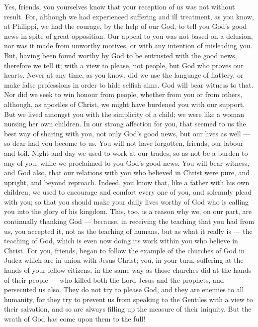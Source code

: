 Yes, friends, you yourselves know that your reception of us
was not without result.  For, although we had experienced
suffering and ill treatment, as you know, at Philippi, we had the
courage, by the help of our God, to tell you God's good news in spite of
great opposition.  Our appeal to you was not based on a
delusion, nor was it made from unworthy motives, or with any intention
of misleading you.  But, having been found worthy by God to
be entrusted with the good news, therefore we tell it; with a view to
please, not people, but God who proves our hearts.  Never at
any time, as you know, did we use the language of flattery, or make
false professions in order to hide selfish aims. God will bear witness
to that.  Nor did we seek to win honour from people, whether
from you or from others, although, as apostles of Christ, we might have
burdened you with our support.  But we lived amongst you
with the simplicity of a child; we were like a woman nursing her own
children.  In our strong affection for you, that seemed to
us the best way of sharing with you, not only God's good news, but our
lives as well --- so dear had you become to us.  You will
not have forgotten, friends, our labour and toil. Night and day we used
to work at our trades, so as not be a burden to any of you, while we
proclaimed to you God's good news.  You will bear witness,
and God also, that our relations with you who believed in Christ were
pure, and upright, and beyond reproach.  Indeed, you know
that, like a father with his own children, we used to encourage and
comfort every one of you, and solemnly plead with you;  so
that you should make your daily lives worthy of God who is calling you
into the glory of his kingdom.  This, too, is a reason why
we, on our part, are continually thanking God --- because, in receiving
the teaching that you had from us, you accepted it, not as the teaching
of humans, but as what it really is --- the teaching of God, which is
even now doing its work within you who believe in Christ. 
For you, friends, began to follow the example of the churches of God in
Judea which are in union with Jesus Christ; you, in your turn, suffering
at the hands of your fellow citizens, in the same way as those churches
did at the hands of their people ---  who killed both the
Lord Jesus and the prophets, and persecuted us also. They do not try to
please God, and they are enemies to all humanity,  for they
try to prevent us from speaking to the Gentiles with a view to their
salvation, and so are always filling up the measure of their iniquity.
But the wrath of God has come upon them to the full!

